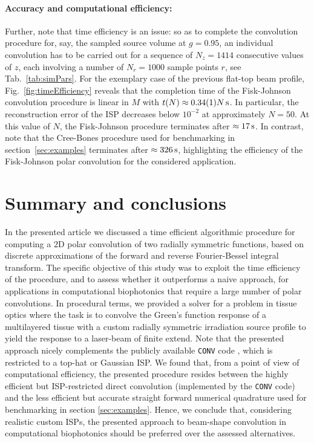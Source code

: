 \documentclass[12pt]{iopart}
\begin{document}
\paragraph{Accuracy and computational efficiency:}
Further, note that time efficiency is an issue: so as to complete the
convolution procedure for, say, the sampled source volume at $g=0.95$, an
individual convolution has to be carried out for a sequence of $N_z=1414$
consecutive values of $z$, each involving a number of $N_r=1000$ sample points
$r$, see Tab.~\ref{tab:simPars}. For the exemplary case of the previous
flat-top beam profile, Fig.~\ref{fig:timeEfficiency} reveals that the
completion time of the Fisk-Johnson convolution procedure is linear in $M$ with
$t(N)\approx 0.34(1) N \,{\rm{s}}$. In particular, the reconstruction
error of the ISP decreases below $10^{-2}$ at approximately $N=50$. At this
value of $N$, the Fisk-Johnson procedure terminates after $\approx
17\,{\rm{s}}$.  In contrast, note that the Cree-Bones procedure used for
benchmarking in section~\ref{sec:examples} terminates after $\approx
326\,{\rm{s}}$, highlighting the efficiency of the Fisk-Johnson polar
convolution for the considered application. 


\section{Summary and conclusions}
\label{sec:fin}

In the presented article we discussed a time efficient algorithmic procedure
for computing a $2$D polar convolution of two radially symmetric functions,
based on discrete approximations of the forward and reverse Fourier-Bessel
integral transform. 
The specific objective of this study was to exploit the time efficiency of the
procedure, and to assess whether it outperforms a naive approach, for
applications in computational biophotonics that require a large number of polar
convolutions. 
In procedural terms, we provided a solver for a problem in tissue optics where
the task is to convolve the Green's function response of a
multilayered tissue with a custom radially symmetric irradiation source profile
to yield the response to a laser-beam of finite extend. Note that the 
presented approach nicely complements the publicly available {\tt CONV} code
\cite{CONV:1997}, which is restricted to a top-hat or Gaussian ISP.
We found that, from a point of view of computational efficiency, the presented
procedure resides between the highly efficient but ISP-restricted direct
convolution (implemented by the {\tt CONV} code) and the less efficient but
accurate straight forward numerical quadrature used for benchmarking in section
\ref{sec:examples}.
Hence, we conclude that, considering realistic custom ISPs, the presented
approach to beam-shape convolution in computational biophotonics should be
preferred over the assessed alternatives.
\end{document}
